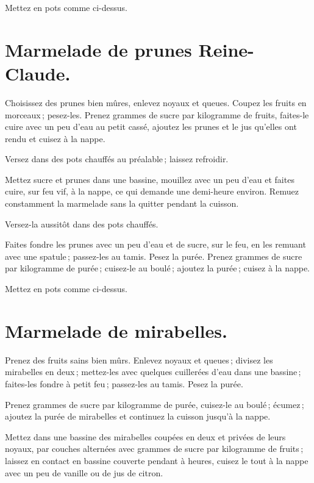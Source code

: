 Mettez en pots comme ci-dessus.

\section*{\centering Marmelade de prunes Reine-Claude.}
{}

Choisissez des prunes bien mûres, enlevez noyaux et queues. Coupez les fruits
en morceaux ; pesez-les. Prenez {\mmm} grammes de sucre par kilogramme
de fruits, faites-le cuire avec un peu d'eau au petit cassé, ajoutez les prunes
et le jus qu'elles ont rendu et cuisez à la nappe.

Versez dans des pots chauffés au préalable ; laissez refroidir.

\sk

Mettez sucre et prunes dans une bassine, mouillez avec un peu d'eau et faites
cuire, sur feu vif, à la nappe, ce qui demande une demi-heure environ. Remuez
constamment la marmelade sans la quitter pendant la cuisson.

Versez-la aussitôt dans des pots chauffés.

\sk

Faites fondre les prunes avec un peu d'eau et de sucre, sur le feu, en les
remuant avec une spatule ; passez-les au tamis. Pesez la purée. Prenez
{\mmm} grammes de sucre par kilogramme de purée ; cuisez-le au boulé ;
ajoutez la purée ; cuisez à la nappe.

Mettez en pots comme ci-dessus.

\section*{\centering Marmelade de mirabelles.}
{}

Prenez des fruits sains bien mûrs. Enlevez noyaux et queues ; divisez les
mirabelles en deux ; mettez-les avec quelques cuillerées d'eau dans une
bassine ; faites-les fondre à petit feu ; passez-les au tamis. Pesez la purée.

Prenez {\mmm} grammes de sucre par kilogramme de purée, cuisez-le au boulé ;
écumez ; ajoutez la purée de mirabelles et continuez la cuisson jusqu'à la nappe.

\sk

Mettez dans une bassine des mirabelles coupées en deux et privées de leurs
noyaux, par couches alternées avec {\mmm} grammes de sucre par
kilogramme de fruits ; laissez en contact en bassine couverte pendant
{\mmm} à {\mmm} heures, cuisez le tout à la nappe avec un peu de
vanille ou de jus de citron.

